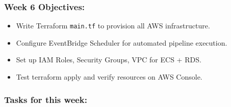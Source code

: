 \hypertarget{week-6-objectives}{%
\subsubsection{Week 6 Objectives:}}

\begin{itemize}
\tightlist
\item
  Write Terraform \texttt{main.tf} to provision all AWS infrastructure.
\item
  Configure EventBridge Scheduler for automated pipeline execution.
\item
  Set up IAM Roles, Security Groups, VPC for ECS + RDS.
\item
  Test terraform apply and verify resources on AWS Console.
\end{itemize}

\hypertarget{tasks-for-this-week}{%
\subsubsection{Tasks for this week:}}

